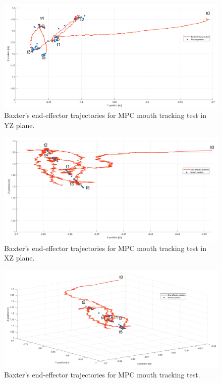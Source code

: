 \documentclass[11pt]{report} %
\begin{document}
\begin{figure}[H]
    \centering
    \includegraphics[width=1.0\linewidth]{assets/imgs/control_theory/mpc_tracking/yz_view.png}
    \caption{Baxter's end-effector trajectories for MPC mouth tracking test in YZ plane.} 
    \label{fig_yz_view_mpc_tracking_experiments}
\end{figure}

\begin{figure}[H]
    \centering
    \includegraphics[width=1.0\linewidth]{assets/imgs/control_theory/mpc_tracking/xz_view.png}
    \caption{Baxter's end-effector trajectories for MPC mouth tracking test in XZ plane.} 
    \label{fig_xz_view_mpc_tracking_experiments}
\end{figure}

\begin{figure}[H]
    \centering
    \includegraphics[width=1.0\linewidth]{assets/imgs/control_theory/mpc_tracking/general_view.png}
    \caption{Baxter's end-effector trajectories for MPC mouth tracking test.} 
    \label{fig_general_view_mpc_tracking_experiments}
\end{figure}
\end{document}
